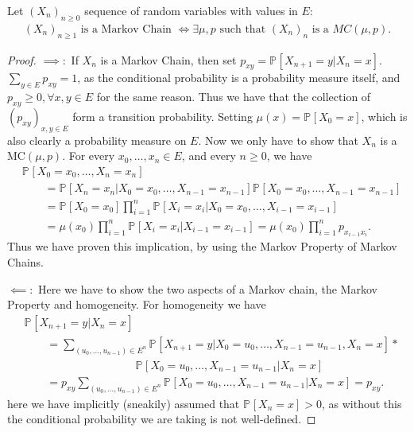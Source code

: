 \begin{prop}
	Let $(X_n)_{n \geq 0}$ sequence of random variables with values in $E$:
	\begin{align}
		(X_n)_{n \geq 1}\textrm{ is a Markov Chain }\iff \exists \mu, p\textrm{ such that }(X_n)_n \textrm{ is a }MC(\mu, p)
	.\end{align}
	
\end{prop}
\begin{proof}
	$\implies:$ If $X_n$ is a Markov Chain, then set $p_{xy}=\mathbb{P}_{} \left[ X_{n+1}=y | X_{n}=x \right] $. $\sum_{y \in E}^{} p_{xy}=1$, as the conditional probability is a probability measure itself, and $p_{xy}\geq 0, \forall x, y \in E$ for the same reason. Thus we have that the collection of $(p_{xy})_{x,y \in E}$ form a transition probability. Setting $\mu(x) = \mathbb{P}_{} \left[ X_0 =x \right] $, which is also clearly a probability measure on $E$. Now we only have to show that $X_{n} $ is a $ \textrm{MC}(\mu, p)$. For every $x_0,\ldots , x_n \in E$, and every $n\geq 0$, we have
\begin{align}
& \mathbb{P}_{} \left[ X_0=x_0, \ldots ,X_n=x_n \right] \\ 
	& \qquad = \mathbb{P}_{} \left[ X_n = x_n | X_0=x_0 , \ldots , X_{n-1}=x_{n-1} \right] \mathbb{P}_{} \left[ X_0=x_0 , \ldots , X_{n-1}=x_{n-1} \right] \\
	& \qquad = \mathbb{P}_{} \left[ X_0 = x_0 \right] \prod_{i=1}^{n} \mathbb{P}_{} \left[ X_i = x_i | X_0=x_0, \ldots , X_{i-1}=x_{i-1} \right] \\
	& \qquad = \mu(x_0) \prod_{i=1}^n \mathbb{P}_{} \left[ X_i = x_i | X_{i-1} = x_{i-1}  \right] = \mu(x_0) \prod_{i=1}^n p_{x_{i-1}x_{i}} 
.\end{align}
Thus we have proven this implication, by using the Markov Property of Markov Chains.

$\impliedby:$ Here we have to show the two aspects of a Markov chain, the Markov Property and homogeneity. For homogeneity we have
\begin{align}
&	\mathbb{P}_{} \left[ X_{n+1} = y | X_n =x \right] \\
&\qquad = \sum_{(u_0, \ldots ,u_{n-1}) \in E^n}^{} \mathbb{P}_{} \left[ X_{n+1}=y | X_0=u_0, \ldots ,X_{n-1}=u_{n-1}, X_n =x \right] * \\
& \qquad \qquad \qquad \qquad \qquad  \mathbb{P}_{} \left[ X_0=u_0, \ldots , X_{n-1}=u_{n-1} | X_n = x \right] \\
&\qquad = p_{xy} \sum_{(u_0, \ldots ,u_{n-1})\in E^n}^{} \mathbb{P}_{} \left[ X_0=u_0, \ldots ,X_{n-1}=u_{n-1} | X_n = x \right] = p_{xy}
.\end{align}
here we have implicitly (sneakily) assumed that $\mathbb{P}_{} \left[ X_n = x \right] > 0$, as without this the conditional probability we are taking is not well-defined.


\end{proof}

